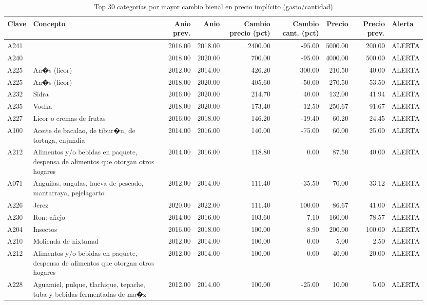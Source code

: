 \begin{table}[ht]
\centering
\caption{Top 30 categor\'ias por mayor cambio bienal en precio impl\'icito (gasto/cantidad)} 
\label{tab:20a_cambio_precio_bienal}
\begin{tabular}{llrrrrrrl}
  \toprule
Clave & Concepto & Anio prev. & Anio & Cambio precio (pct) & Cambio cant. (pct) & Precio & Precio prev. & Alerta \\ 
  \midrule
A241 &  & 2016.00 & 2018.00 & 2400.00 & -95.00 & 5000.00 & 200.00 & ALERTA \\ 
  A240 &  & 2018.00 & 2020.00 & 700.00 & -95.00 & 4000.00 & 500.00 & ALERTA \\ 
  A225 & An�s (licor) & 2012.00 & 2014.00 & 426.20 & 300.00 & 210.50 & 40.00 & ALERTA \\ 
  A225 & An�s (licor) & 2018.00 & 2020.00 & 405.60 & -50.00 & 270.50 & 53.50 & ALERTA \\ 
  A232 & Sidra & 2016.00 & 2020.00 & 214.70 & 40.00 & 132.00 & 41.94 & ALERTA \\ 
  A235 & Vodka & 2018.00 & 2020.00 & 173.40 & -12.50 & 250.67 & 91.67 & ALERTA \\ 
  A227 & Licor o cremas de frutas & 2016.00 & 2018.00 & 146.20 & -19.40 & 60.20 & 24.45 & ALERTA \\ 
  A100 & Aceite de bacalao, de tibur�n, de tortuga, enjundia & 2014.00 & 2016.00 & 140.00 & -75.00 & 60.00 & 25.00 & ALERTA \\ 
  A212 & Alimentos y/o bebidas en paquete, despensa de alimentos que otorgan otros hogares & 2014.00 & 2016.00 & 118.80 & 0.00 & 87.50 & 40.00 & ALERTA \\ 
  A071 & Anguilas, angulas, hueva de pescado, mantarraya, pejelagarto & 2012.00 & 2014.00 & 111.40 & -35.50 & 70.00 & 33.12 & ALERTA \\ 
  A226 & Jerez & 2020.00 & 2022.00 & 111.40 & 100.00 & 86.67 & 41.00 & ALERTA \\ 
  A230 & Ron: añejo & 2014.00 & 2016.00 & 103.60 & 7.10 & 160.00 & 78.57 & ALERTA \\ 
  A204 & Insectos & 2016.00 & 2018.00 & 100.00 & 8.90 & 200.00 & 100.00 & ALERTA \\ 
  A210 & Molienda de nixtamal & 2012.00 & 2014.00 & 100.00 & 0.00 & 5.00 & 2.50 & ALERTA \\ 
  A212 & Alimentos y/o bebidas en paquete, despensa de alimentos que otorgan otros hogares & 2012.00 & 2014.00 & 100.00 & 0.00 & 40.00 & 20.00 & ALERTA \\ 
  A228 & Aguamiel, pulque, tlachique, tepache, tuba y bebidas fermentadas de ma�z & 2012.00 & 2014.00 & 100.00 & -25.00 & 10.00 & 5.00 & ALERTA \\ 

\end{tabular}
\end{table}
